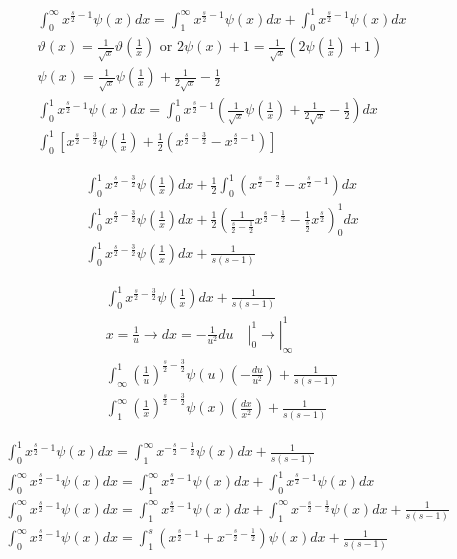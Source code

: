 	$$
	\begin{gathered}
		\int_0^{\infty} x^{\frac{s}{2}-1} \psi(x) d x=\int_1^{\infty} x^{\frac{s}{2}-1} \psi(x) d x+\int_0^1 x^{\frac{s}{2}-1} \psi(x) d x \\
		\vartheta(x)=\frac{1}{\sqrt{x}} \vartheta\left(\frac{1}{x}\right) \text { or } 2 \psi(x)+1=\frac{1}{\sqrt{x}}\left(2 \psi\left(\frac{1}{x}\right)+1\right) \\
		\psi(x)=\frac{1}{\sqrt{x}} \psi\left(\frac{1}{x}\right)+\frac{1}{2 \sqrt{x}}-\frac{1}{2} \\
		\int_0^1 x^{\frac{s}{2}-1} \psi(x) d x=\int_0^1 x^{\frac{s}{2}-1}\left(\frac{1}{\sqrt{x}} \psi\left(\frac{1}{x}\right)+\frac{1}{2 \sqrt{x}}-\frac{1}{2}\right) d x \\
		\int_0^1\left[x^{\frac{s}{2}-\frac{3}{2}} \psi\left(\frac{1}{x}\right)+\frac{1}{2}\left(x^{\frac{s}{2}-\frac{3}{2}}-x^{\frac{s}{2}-1}\right)\right]
	\end{gathered}
	$$
	
	$$
	\begin{gathered}
		\int_0^1 x^{\frac{s}{2}-\frac{3}{2}} \psi\left(\frac{1}{x}\right) d x+\frac{1}{2} \int_0^1\left(x^{\frac{s}{2}-\frac{3}{2}}-x^{\frac{s}{2}-1}\right) d x \\
		\int_0^1 x^{\frac{s}{2}-\frac{3}{2}} \psi\left(\frac{1}{x}\right) d x+\frac{1}{2}\left(\frac{1}{\frac{s}{2}-\frac{1}{2}} x^{\frac{s}{2}-\frac{1}{2}}-\frac{1}{\frac{s}{2}} x^{\frac{s}{2}}\right)_0^1 d x \\
		\int_0^1 x^{\frac{s}{2}-\frac{3}{2}} \psi\left(\frac{1}{x}\right) d x+\frac{1}{s(s-1)}
	\end{gathered}
	$$
	
	$$
	\begin{gathered}
		\int_0^1 x^{\frac{s}{2}-\frac{3}{2}} \psi\left(\frac{1}{x}\right) d x+\frac{1}{s(s-1)} \\
		x=\frac{1}{u} \rightarrow d x=-\left.\left.\frac{1}{u^2} d u \quad\right|_0 ^1 \rightarrow\right|_{\infty} ^1 \\
		\int_{\infty}^1\left(\frac{1}{u}\right)^{\frac{s}{2}-\frac{3}{2}} \psi(u)\left(-\frac{d u}{u^2}\right)+\frac{1}{s(s-1)} \\
		\int_1^{\infty}\left(\frac{1}{x}\right)^{\frac{s}{2}-\frac{3}{2}} \psi(x)\left(\frac{d x}{x^2}\right)+\frac{1}{s(s-1)}
	\end{gathered}
	$$
	
	$$
	\begin{aligned}
		& \int_0^1 x^{\frac{s}{2}-1} \psi(x) d x=\int_1^{\infty} x^{-\frac{s}{2}-\frac{1}{2}} \psi(x) d x+\frac{1}{s(s-1)} \\
		& \int_0^{\infty} x^{\frac{s}{2}-1} \psi(x) d x=\int_1^{\infty} x^{\frac{s}{2}-1} \psi(x) d x+\int_0^1 x^{\frac{s}{2}-1} \psi(x) d x \\
		& \int_0^{\infty} x^{\frac{s}{2}-1} \psi(x) d x=\int_1^{\infty} x^{\frac{s}{2}-1} \psi(x) d x+\int_1^{\infty} x^{-\frac{s}{2}-\frac{1}{2}} \psi(x) d x+\frac{1}{s(s-1)} \\
		& \int_0^{\infty} x^{\frac{s}{2}-1} \psi(x) d x=\int_1^s\left(x^{\frac{s}{2}-1}+x^{-\frac{s}{2}-\frac{1}{2}}\right) \psi(x) d x+\frac{1}{s(s-1)}
	\end{aligned}
	$$
	
